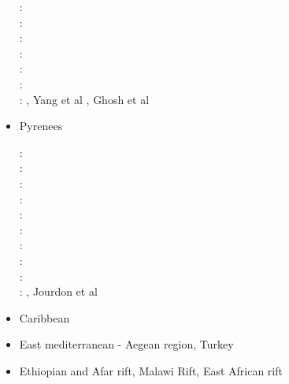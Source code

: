 \begin{itemize}
\begin{scriptsize}
\twothousandfourteen: \cite{whbb14}\cite{mutg14}\cite{stjm14}\cite{lesh14}\\
\twothousandfifteen: \cite{puka15}\cite{jarh15}\cite{yoha15}\\
\twothousandsixteen: \cite{kebb16}\cite{staj16}\\
\twothousandseventeen: \cite{bube17}\\
\twothousandeighteen: \cite{pirf18}\cite{pukp18}\cite{flbb18}\\
\twothousandnineteen: \cite{sccs19}\cite{scvm19}\cite{wazg19}\cite{scdh19}\\
\twothousandtwenty: \cite{livn20}\cite{chlc20}\cite{pust20}, Yang et al \cite{yakl20}, Ghosh et al \cite{ghbm20}
\end{scriptsize}

\item {Pyrenees} 
\begin{scriptsize}
\nineteenninetytwo: \cite{chou92}\\
\nineteenninetythree: \cite{qubh93}\\
\nineteenninetyeight: \cite{giju98}\\
\twothousand: \cite{bemh00}\\
\twothousandfour: \cite{mcmg04}\cite{siss04}\\
\twothousandten: \cite{jaml10}\\
\twothousandtwelve: \cite{vime12}\\
\twothousandthirteen: \cite{fihv13b}\\
\twothousandfourteen: \cite{jahm14}\\
\twothousandnineteen: \cite{dual19}, Jourdon et al \cite{jolm19}
\end{scriptsize}

\item{Caribbean} 
{\scriptsize
\cite{vago10}
\cite{vags13}
\cite{bovt14}\cite{vagw14}\cite{necb14}
\cite{homi15}\cite{necb15}
\cite{phvb20}\cite{mugu20}
}
\item{East mediterranean - Aegean region, Turkey} 
{\scriptsize
\cite{gabm99}
\cite{cazf10}
\cite{enlm11}
\cite{jofh13}
\cite{ozgw17}
\cite{rohb20}\cite{femb20}
}
\item{Ethiopian and Afar rift, Malawi Rift, East African rift} 


\end{itemize}
